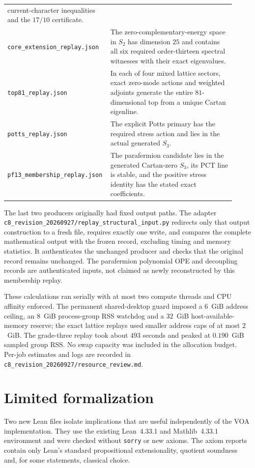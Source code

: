 \documentclass[11pt,a4paper]{article}
\theoremstyle{definition}
\newcommand{\artifact}[1]{\textnormal{\nolinkurl{#1}}}
\begin{document}
\begin{longtable}{@{}p{0.38\linewidth}p{0.54\linewidth}@{}}
current-character inequalities and the $17/10$ certificate.\\
\artifact{core_extension_replay.json} & The zero-complementary-energy
space in $S_2$ has dimension $25$ and contains all six required
order-thirteen spectral witnesses with their exact eigenvalues.\\
\artifact{top81_replay.json} & In each of four mixed lattice sectors,
exact zero-mode actions and weighted adjoints generate the entire
$81$-dimensional top from a unique Cartan eigenline.\\
\artifact{potts_replay.json} & The explicit Potts primary has the
required stress action and lies in the actual generated $S_3$.\\
\artifact{pf13_membership_replay.json} & The parafermion candidate
lies in the generated Cartan-zero $S_3$, its PCT line is stable,
and the positive stress identity has the stated exact coefficients.\\
\end{longtable}

The last two producers originally had fixed output paths. The adapter
\artifact{c8_revision_20260927/replay_structural_input.py} redirects
only that output construction to a fresh file, requires exactly one
write, and compares the complete mathematical output with the frozen
record, excluding timing and memory statistics. It authenticates the
unchanged producer and checks that the original record remains unchanged.
The parafermion polynomial OPE and decoupling records are authenticated
inputs, not claimed as newly reconstructed by this membership replay.

These calculations ran serially with at most two compute threads and
CPU affinity enforced. The permanent shared-desktop guard imposed
a $6$~GiB address ceiling, an $8$~GiB process-group RSS watchdog and
a $32$~GiB host-available-memory reserve; the exact lattice replays
used smaller address caps of at most $2$~GiB. The grade-three replay
took about $493$ seconds and peaked at $0.190$~GiB sampled group RSS.
No swap capacity was included in the allocation budget. Per-job
estimates and logs are recorded in
\artifact{c8_revision_20260927/resource_review.md}.

\section{Limited formalization}\label{sec:formalization}
Two new Lean files isolate implications that are useful independently
of the VOA implementation. They use the existing Lean~4.33.1 and
Mathlib~4.33.1 environment and were checked without \texttt{sorry} or
new axioms. The axiom reports contain only Lean's standard
propositional extensionality, quotient soundness and, for some
statements, classical choice.
\end{document}
